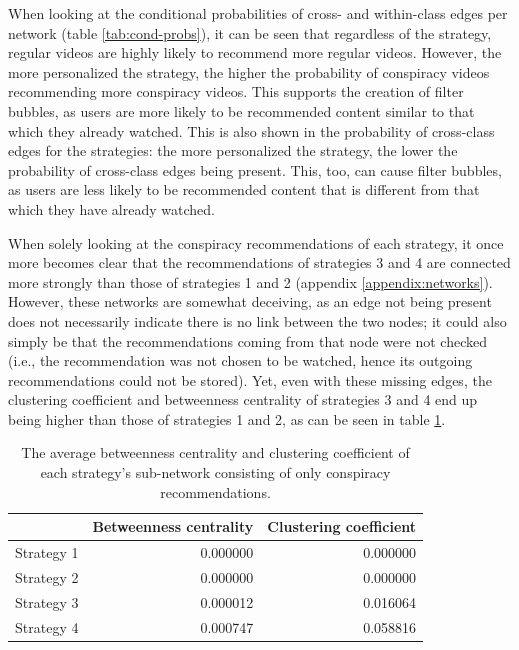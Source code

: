 \documentclass[../main.tex]{subfiles}
\begin{document}

When looking at the conditional probabilities of cross- and within-class edges per network (table 
\ref{tab:cond-probs}), it can be seen that regardless of the strategy, regular videos are highly likely to 
recommend more regular videos. However, the more personalized the strategy, the higher the probability of 
conspiracy videos recommending more conspiracy videos. This supports the creation of filter bubbles, as 
users are more likely to be recommended content similar to that which they already watched. This is also 
shown in the probability of cross-class edges for the strategies: the more personalized the strategy, the 
lower the probability of cross-class edges being present. This, too, can cause filter bubbles, as users are 
less likely to be recommended content that is different from that which they have already watched. 

When solely looking at the conspiracy recommendations of each strategy, it once more becomes clear that the 
recommendations of strategies 3 and 4 are connected more strongly than those of strategies 1 and 2 (appendix 
\ref{appendix:networks}). However, these networks are somewhat deceiving, as an edge not being present does not 
necessarily indicate there is no link between the two nodes; it could also simply be that the recommendations 
coming from that node were not checked (i.e., the recommendation was not chosen to be watched, hence its 
outgoing recommendations could not be stored). Yet, even with these missing edges, the clustering coefficient 
and betweenness centrality of strategies 3 and 4 end up being higher than those of strategies 1 and 2, as can be
seen in table \ref{tab:sub-net_metrics}. 

\begin{table}
\centering
\begin{tabular}{lrr}
\toprule
{} &  Betweenness centrality &  Clustering coefficient \\
\midrule
Strategy 1 &                0.000000 &                0.000000 \\
Strategy 2 &                0.000000 &                0.000000 \\
Strategy 3 &                0.000012 &                0.016064 \\
Strategy 4 &                0.000747 &                0.058816 \\
\bottomrule
\end{tabular}
\caption{\label{tab:sub-net_metrics} The average betweenness centrality and clustering coefficient of each strategy's sub-network consisting of only conspiracy recommendations.}
\end{table}
\end{document}
